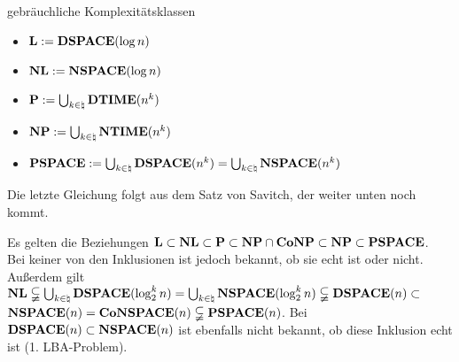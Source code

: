 \linie

\begin{Def}{gebräuchliche Komplexitätsklassen}
    \begin{itemize}
        \item
        $\mathbf{L} := \mathbf{DSPACE}(\log n)$
        
        \item
        $\mathbf{NL} := \mathbf{NSPACE}(\log n)$
        
        \item
        $\mathbf{P} := \bigcup_{k \in \natural} \mathbf{DTIME}(n^k)$
        
        \item
        $\mathbf{NP} := \bigcup_{k \in \natural} \mathbf{NTIME}(n^k)$
        
        \item
        $\mathbf{PSPACE} := \bigcup_{k \in \natural} \mathbf{DSPACE}(n^k) =
        \bigcup_{k \in \natural} \mathbf{NSPACE}(n^k)$
    \end{itemize}
\end{Def}

\begin{Bem}
    Die letzte Gleichung folgt aus dem Satz von Savitch, der weiter unten noch kommt.
\end{Bem}

\linie
\pagebreak

\begin{Bem}
    Es gelten die Beziehungen
    $\mathbf{L} \subset \mathbf{NL} \subset \mathbf{P} \subset \mathbf{NP} \cap \mathbf{Co}\mathbf{NP} \subset
    \mathbf{NP} \subset \mathbf{PSPACE}$.\\
    Bei keiner von den Inklusionen ist jedoch bekannt, ob sie echt ist oder nicht.\\
    Außerdem gilt $\mathbf{NL} \subsetneqq \bigcup_{k \in \natural} \mathbf{DSPACE}(\log_2^k n) =
    \bigcup_{k \in \natural} \mathbf{NSPACE}(\log_2^k n) \subsetneqq \mathbf{DSPACE}(n) \subset$\\
    $\mathbf{NSPACE}(n) = \mathbf{Co}\mathbf{NSPACE}(n) \subsetneqq \mathbf{PSPACE}(n)$.
    Bei $\mathbf{DSPACE}(n) \subset \mathbf{NSPACE}(n)$ ist ebenfalls nicht bekannt, ob diese Inklusion echt ist
    (1. LBA-Problem).
\end{Bem}

